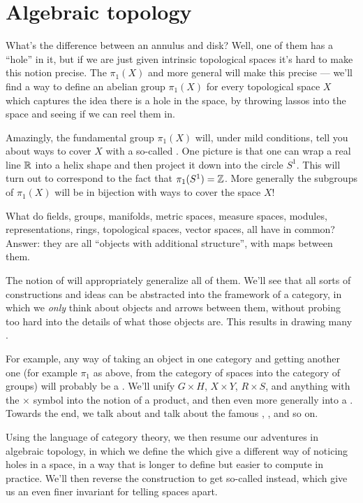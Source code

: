 \section{Algebraic topology}
\begin{itemize}
What's the difference between an annulus and disk?
Well, one of them has a ``hole'' in it,
but if we are just given intrinsic topological spaces
it's hard to make this notion precise.
The  $\pi_1(X)$
and more general 
will make this precise --- we'll find a way to define an abelian group
$\pi_1(X)$ for every topological space $X$ which captures the idea
there is a hole in the space, by throwing lassos into the space
and seeing if we can reel them in.

Amazingly, the fundamental group $\pi_1(X)$ will, under mild conditions,
tell you about ways to cover $X$ with a so-called
.
One picture is that one can wrap a real line $\mathbb R$ into a helix shape
and then project it down into the circle $S^1$.
This will turn out to correspond to the fact that $\pi_1(S^1) = \mathbb Z$.
More generally the subgroups of $\pi_1(X)$ will be in
bijection with ways to cover the space $X$!

What do fields, groups, manifolds, metric spaces, measure spaces,
modules, representations, rings, topological spaces, vector spaces,
all have in common?
Answer: they are all ``objects with additional structure'',
with maps between them.

The notion of  will appropriately generalize all of them.
We'll see that all sorts of constructions and ideas
can be abstracted into the framework of a category,
in which we \emph{only} think about objects and arrows between them,
without probing too hard into the details of what those objects are.
This results in drawing many .

For example, any way of taking an object in one category
and getting another one (for example $\pi_1$ as above,
from the category of spaces into the category of groups)
will probably be a .
We'll unify $G \times H$, $X \times Y$, $R \times S$,
and anything with the $\times$ symbol into the notion of a product,
and then even more generally into a .
Towards the end, we talk about 
and talk about the famous
, , and so on.

Using the language of category theory,
we then resume our adventures in algebraic topology,
in which we define the 
which give a different way of noticing holes in a space,
in a way that is longer to define but easier to compute in practice.
We'll then reverse the construction to get so-called
 instead,
which give us an even finer invariant for telling spaces apart.
\end{itemize}

